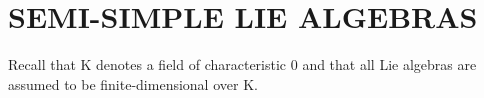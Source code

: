 \section{SEMI-SIMPLE LIE ALGEBRAS}

Recall that K denotes a field of characteristic 0 and that all Lie algebras are assumed to be finite-dimensional over K.

